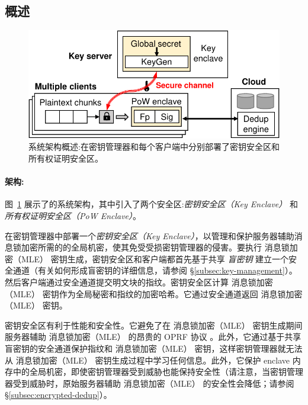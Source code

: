 \subsection{概述}
\label{subsec:arch}

\begin{figure}[t]
\centering
\includegraphics[width=\textwidth]{pic/sgxdedup/overview.pdf}
\caption{\sysnameS 系统架构概述:\sysnameS 在密钥管理器和每个客户端中分别部署了密钥安全区和所有权证明安全区。}
\label{fig:overview}
\vspace{-3pt}
\end{figure}

\paragraph{架构:} 图~\ref{fig:overview} 展示了\sysnameS 的系统架构，其中引入了两个安全区:\textit{密钥安全区（Key Enclave）} 和 \textit{所有权证明安全区（PoW Enclave）}。 

\sysnameS 在密钥管理器中部署一个\textit{密钥安全区（Key Enclave）}，以管理和保护服务器辅助消息锁加密所需的的全局机密，使其免受受损密钥管理器的侵害。要执行 消息锁加密（MLE） 密钥生成，密钥安全区和客户端都首先基于共享 \textit{盲密钥} 建立一个安全通道（有关如何形成盲密钥的详细信息，请参阅 \S\ref{subsec:key-management}）。然后客户端通过安全通道提交明文块的指纹。密钥安全区计算 消息锁加密（MLE） 密钥作为全局秘密和指纹的加密哈希。它通过安全通道返回 消息锁加密（MLE） 密钥。

密钥安全区有利于性能和安全性。它避免了在 消息锁加密（MLE） 密钥生成期间服务器辅助 消息锁加密（MLE） 的昂贵的 OPRF 协议 \cite{bellare13b}。此外，它通过基于共享盲密钥的安全通道保护指纹和 消息锁加密（MLE） 密钥，这样密钥管理器就无法从 消息锁加密（MLE） 密钥生成过程中学习任何信息。此外，它保护 enclave 内存中的全局机密，即使密钥管理器受到威胁也能保持安全性（请注意，当密钥管理器受到威胁时，原始服务器辅助 消息锁加密（MLE） 的安全性会降低；请参阅 \S\ref{subsec:encrypted-dedup}）。

